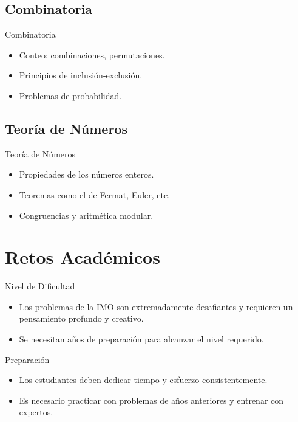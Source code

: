 \documentclass{beamer}
\begin{document}
\subsection{Combinatoria}
\begin{frame}{Combinatoria}
    \begin{itemize}
        \item Conteo: combinaciones, permutaciones.
        \item Principios de inclusión-exclusión.
        \item Problemas de probabilidad.
    \end{itemize}
\end{frame}

\subsection{Teoría de Números}
\begin{frame}{Teoría de Números}
    \begin{itemize}
        \item Propiedades de los números enteros.
        \item Teoremas como el de Fermat, Euler, etc.
        \item Congruencias y aritmética modular.
    \end{itemize}
\end{frame}

\section{Retos Académicos}
\begin{frame}{Nivel de Dificultad}
    \begin{itemize}
        \item Los problemas de la IMO son extremadamente desafiantes y requieren un pensamiento profundo y creativo.
        \item Se necesitan años de preparación para alcanzar el nivel requerido.
    \end{itemize}
\end{frame}

\begin{frame}{Preparación}
    \begin{itemize}
        \item Los estudiantes deben dedicar tiempo y esfuerzo consistentemente.
        \item Es necesario practicar con problemas de años anteriores y entrenar con expertos.
    \end{itemize}
\end{frame}
\end{document}
